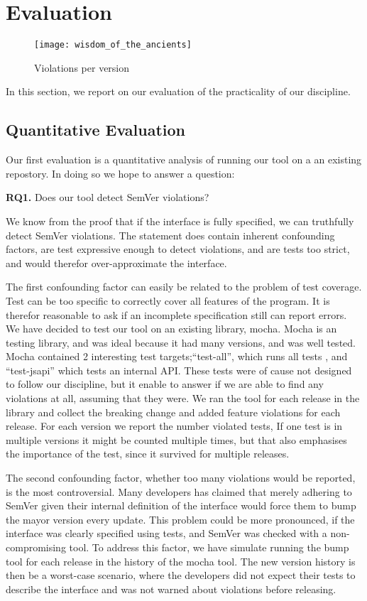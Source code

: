 \section{Evaluation}

\begin{figure}
\centering
\texttt{[image: wisdom\_of\_the\_ancients]}
\caption{Violations per version}
\end{figure}

In this section, we report on our evaluation of the practicality of
our discipline. 

\subsection{Quantitative Evaluation}

Our first evaluation is a quantitative analysis of running our tool on a
an existing repostory. In doing so we hope to answer a question:

{\bf RQ1.} Does our tool detect SemVer violations?

We know from the proof that if the interface is fully specified, we can
truthfully detect SemVer violations. The statement does contain 
inherent confounding factors, are test expressive enough to detect
violations, and are tests too strict, and would therefor over-approximate 
the interface.

The first confounding factor can easily be related to the problem of
test coverage. Test can be too specific to correctly cover all features
of the program. It is therefor reasonable to ask if an incomplete
specification still can report errors. We have decided to test our tool
on an existing library, mocha\cite{mocha}. Mocha is an testing library,
and was ideal because it had many versions, and was well tested. Mocha
contained 2 interesting test targets;``test-all'', which runs all tests
, and ``test-jsapi'' which tests an internal API\@. These tests were of
cause not designed to follow our discipline, but it enable to answer if
we are able to find any violations at all, assuming that they were. We
ran the tool for each release in the library and collect the breaking
change and added feature violations for each release. For each version
we report the number violated tests, If one test is in multiple versions
it might be counted multiple times, but that also emphasises the
importance of the test, since it survived for multiple releases.

The second confounding factor, whether too many violations would be
reported, is the most controversial. Many developers has claimed that
merely adhering to SemVer given their internal definition of the
interface would force them to bump the mayor version every
update\cite{backbone-2888,exoplayer-1382,crawford-not-semver}. This problem could be
more pronounced, if the interface was clearly specified using tests, and
SemVer was checked with a non-compromising tool. To address this factor,
we have simulate running the bump tool for each release in the history
of the mocha tool. The new version history is then be a worst-case
scenario, where the developers did not expect their tests to describe
the interface and was not warned about violations before releasing.

